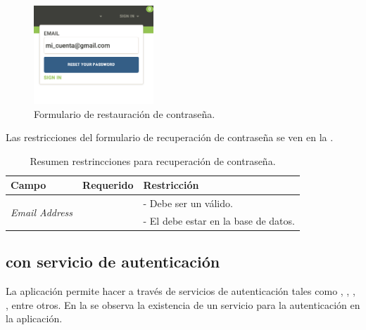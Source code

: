 \begin{figure}[H]
	\centering
	\includegraphics[width=0.4\textwidth]{figuras/architecture/accounts/reset/form.png}
	\caption{Formulario de restauración de contraseña.}
	\label{figure:architecture:accounts:reset:form}
\end{figure}

Las restricciones del formulario de recuperación de contraseña se ven en la .

\begin{table}[H]
    \centering
	\begin{tabular}{ |l|c||l| }
		\hline Campo & Requerido & Restricción \\ \hline
		\multirow{2}{*}{\textit{Email Address}} &  \multirow{2}{*}{\checkmark}
				& - Debe ser un \email válido. \\ 
			& 	& - El \email debe estar en la base de datos. \\ \hline
	\end{tabular}
 	\caption{Resumen restrincciones para recuperación de contraseña.}
    \label{tab:architecture:accounts:recovery:form}
\end{table}

\subsection{\loginUpperCPT  con servicio de autenticación \thirdParty}

La aplicación permite hacer \loginCPT a través de servicios de autenticación \thirdParty tales como \facebook, \googleNAME, \twitterNAME, \gitHubNAME, entre otros. En la  se observa la existencia de un servicio \thirdParty para la autenticación en la aplicación.


